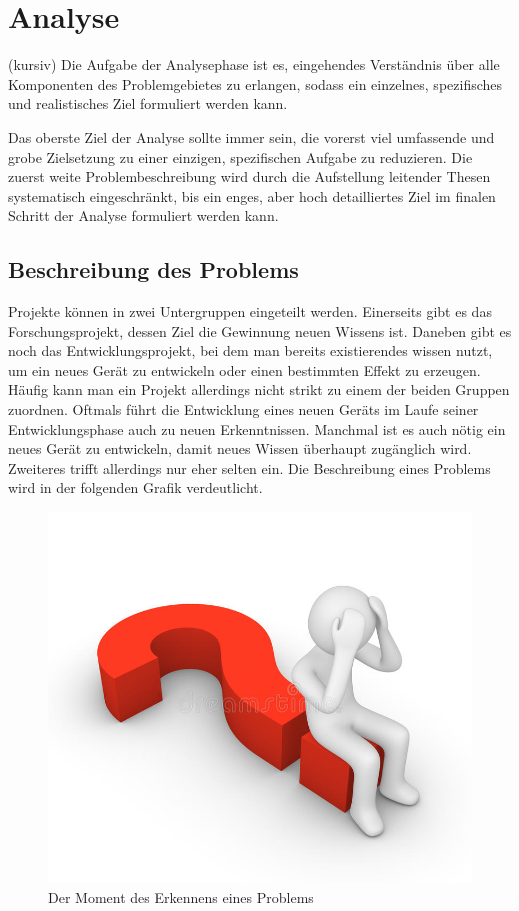 \section{Analyse}
(kursiv)
Die Aufgabe der Analysephase ist es, eingehendes Verständnis über alle Komponenten des Problemgebietes 
zu erlangen, sodass ein einzelnes, spezifisches und realistisches Ziel formuliert werden kann.

Das oberste Ziel der Analyse sollte immer sein, die vorerst viel umfassende und grobe Zielsetzung zu 
einer einzigen, spezifischen Aufgabe zu reduzieren. Die zuerst weite Problembeschreibung wird durch 
die Aufstellung leitender Thesen systematisch eingeschränkt, bis ein enges, aber hoch detailliertes 
Ziel im finalen Schritt der Analyse formuliert werden kann.

    \subsection{Beschreibung des Problems}

    Projekte können in zwei Untergruppen eingeteilt werden. Einerseits gibt es das Forschungsprojekt, 
    dessen Ziel die Gewinnung neuen Wissens ist. Daneben gibt es noch das Entwicklungsprojekt, bei dem 
    man bereits existierendes wissen nutzt, um ein neues Gerät zu entwickeln oder einen bestimmten 
    Effekt zu erzeugen. Häufig kann man ein Projekt allerdings nicht strikt zu einem der beiden 
    Gruppen zuordnen. Oftmals führt die Entwicklung eines neuen Geräts im Laufe seiner Entwicklungsphase 
    auch zu neuen Erkenntnissen. Manchmal ist es auch nötig ein neues Gerät zu entwickeln, damit neues 
    Wissen überhaupt zugänglich wird. Zweiteres trifft allerdings nur eher selten ein.
    Die Beschreibung eines Problems wird in der folgenden Grafik verdeutlicht.

    \begin{figure}[H]
        \centering
        \includegraphics[width=0.5\linewidth]{graphics/problem.jpg}
        \caption[Problemerkennung]{Der Moment des Erkennens eines Problems}

        
        \label{fig:problemloesung}
    \end{figure}

